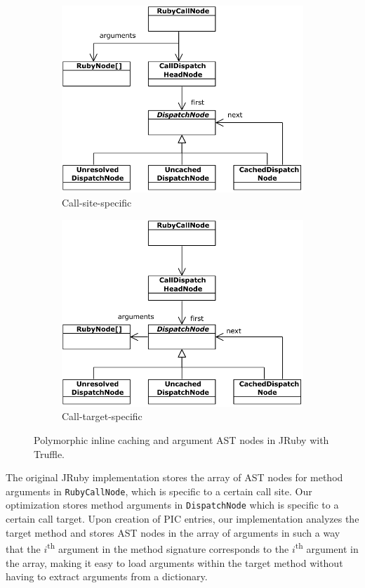 \documentclass[10pt]{sigplanconf}
\begin{document}
\begin{figure}
        \centering
        \begin{subfigure}{.48\linewidth}
          \centering
          \includegraphics[width=.75\linewidth]{resources/dispatch}
          \caption{Call-site-specific}
        \end{subfigure}
        \hspace{1em}
        \begin{subfigure}{.48\linewidth}
          \centering
          \includegraphics[width=.75\linewidth]{resources/dispatch_opt}
          \caption{Call-target-specific}
        \end{subfigure}
    \caption{Polymorphic inline caching and argument AST nodes in JRuby with Truffle.}
    \label{fig:pic_jruby}
\end{figure}

The original JRuby implementation stores the array of AST nodes for method arguments in \lstinline{RubyCallNode}, which is specific to a certain call site. Our optimization stores method arguments in \lstinline{DispatchNode} which is specific to a certain call target. Upon creation of PIC entries, our implementation analyzes the target method and stores AST nodes in the array of arguments in such a way that the $i$\textsuperscript{th} argument in the method signature corresponds to the $i$\textsuperscript{th} argument in the array, making it easy to load arguments within the target method without having to extract arguments from a dictionary.
\end{document}
